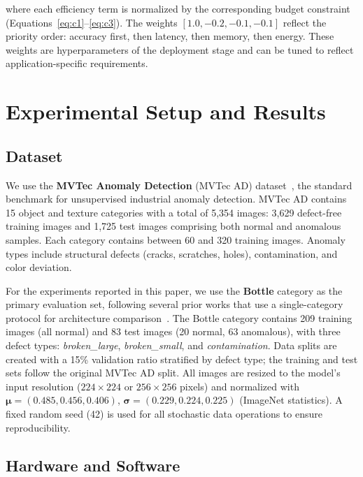\documentclass[journal]{IEEEtran}
\begin{document}
where each efficiency term is normalized by the corresponding budget constraint
(Equations~\ref{eq:c1}--\ref{eq:c3}).
The weights $[1.0, -0.2, -0.1, -0.1]$ reflect the priority order: accuracy
first, then latency, then memory, then energy.
These weights are hyperparameters of the deployment stage and can be tuned
to reflect application-specific requirements.

\section{Experimental Setup and Results}
\label{sec:experiments}

\subsection{Dataset}
\label{sec:dataset}

We use the \textbf{MVTec Anomaly Detection} (MVTec AD)
dataset~\cite{bergmann2019mvtec}, the standard benchmark for unsupervised
industrial anomaly detection.
MVTec AD contains 15 object and texture categories with a total of 5,354
images: 3,629 defect-free training images and 1,725 test images comprising
both normal and anomalous samples.
Each category contains between 60 and 320 training images.
Anomaly types include structural defects (cracks, scratches, holes),
contamination, and color deviation.

For the experiments reported in this paper, we use the \textbf{Bottle} category
as the primary evaluation set, following several prior works that use a
single-category protocol for architecture comparison~\cite{defard2021padim,roth2022towards}.
The Bottle category contains 209 training images (all normal) and 83 test images
(20 normal, 63 anomalous), with three defect types: \textit{broken\_large},
\textit{broken\_small}, and \textit{contamination}.
Data splits are created with a 15\% validation ratio stratified by defect type;
the training and test sets follow the original MVTec AD split.
All images are resized to the model's input resolution ($224\times224$ or
$256\times256$ pixels) and normalized with
$\bm{\mu} = (0.485, 0.456, 0.406)$, $\bm{\sigma} = (0.229, 0.224, 0.225)$
(ImageNet statistics).
A fixed random seed (42) is used for all stochastic data operations to ensure
reproducibility.

\subsection{Hardware and Software}
\label{sec:hardware}
\end{document}
